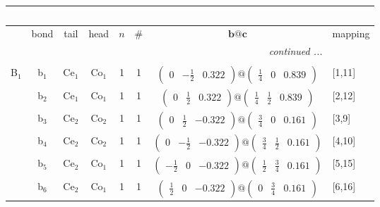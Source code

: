 \documentclass[fleqn,10pt,landscape]{article}
\begin{document}
\begin{itemize}
\begin{center}
\begin{longtable}{cc|cc|c|c|c|l}
\multicolumn{7}{l}{\tablename\ \thetable{}} \\
 \hline \hline
 & bond & tail & head & $n$ & \# & $\bm{b}@\bm{c}$ & mapping \\ \hline \endhead

 \hline \hline
\multicolumn{7}{r}{\footnotesize\it continued ...} \\ \endfoot

 \hline \hline
\multicolumn{7}{r}{} \\ \endlastfoot

B$_{1}$ & b$_{1}$ & Ce$_{1}$ & Co$_{1}$ & 1 & 1 & $\begin{pmatrix} 0 & - \frac{1}{2} & 0.322 \end{pmatrix}@\begin{pmatrix} \frac{1}{4} & 0 & 0.839 \end{pmatrix}$ & [1,11] \\
& b$_{2}$ & Ce$_{1}$ & Co$_{1}$ & 1 & 1 & $\begin{pmatrix} 0 & \frac{1}{2} & 0.322 \end{pmatrix}@\begin{pmatrix} \frac{1}{4} & \frac{1}{2} & 0.839 \end{pmatrix}$ & [2,12] \\
& b$_{3}$ & Ce$_{2}$ & Co$_{2}$ & 1 & 1 & $\begin{pmatrix} 0 & \frac{1}{2} & -0.322 \end{pmatrix}@\begin{pmatrix} \frac{3}{4} & 0 & 0.161 \end{pmatrix}$ & [3,9] \\
& b$_{4}$ & Ce$_{2}$ & Co$_{2}$ & 1 & 1 & $\begin{pmatrix} 0 & - \frac{1}{2} & -0.322 \end{pmatrix}@\begin{pmatrix} \frac{3}{4} & \frac{1}{2} & 0.161 \end{pmatrix}$ & [4,10] \\
& b$_{5}$ & Ce$_{2}$ & Co$_{1}$ & 1 & 1 & $\begin{pmatrix} - \frac{1}{2} & 0 & -0.322 \end{pmatrix}@\begin{pmatrix} \frac{1}{2} & \frac{3}{4} & 0.161 \end{pmatrix}$ & [5,15] \\
& b$_{6}$ & Ce$_{2}$ & Co$_{1}$ & 1 & 1 & $\begin{pmatrix} \frac{1}{2} & 0 & -0.322 \end{pmatrix}@\begin{pmatrix} 0 & \frac{3}{4} & 0.161 \end{pmatrix}$ & [6,16] \\

\end{longtable}
\end{center}
\end{itemize}
\end{document}
